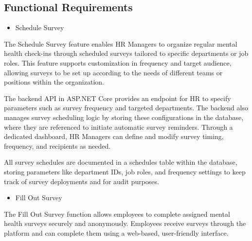 \documentclass[conference]{IEEEtran}
\begin{document}
        \subsection {Functional Requirements}
   
            \begin{itemize}
                \item Schedule Survey 
            \end{itemize}

            The Schedule Survey feature enables HR Managers to organize 
            regular mental health check-ins through scheduled surveys 
            tailored to specific departments or job roles. This feature 
            supports customization in frequency and target audience, 
            allowing surveys to be set up according to the needs of 
            different teams or positions within the organization. 
            \newline

            The backend API in ASP.NET Core provides an endpoint for HR to 
            specify parameters such as survey frequency and targeted 
            departments. The backend also manages survey scheduling 
            logic by storing these configurations in the database, where 
            they are referenced to initiate automatic survey reminders. 
            Through a dedicated dashboard, HR Managers can define and 
            modify survey timing, frequency, and recipients as needed. 
            \newline
        
            All survey schedules are documented in a schedules table 
            within the database, storing parameters like department IDs, 
            job roles, and frequency settings to keep track of survey 
            deployments and for audit purposes.
            \newline
           
            \begin{itemize}
                \item Fill Out Survey 
            \end{itemize}
        
            The Fill Out Survey function allows employees to complete 
            assigned mental health surveys securely and anonymously. 
            Employees receive surveys through the platform and can complete them using a web-based, user-friendly interface. 
            \newline
            
\end{document}
